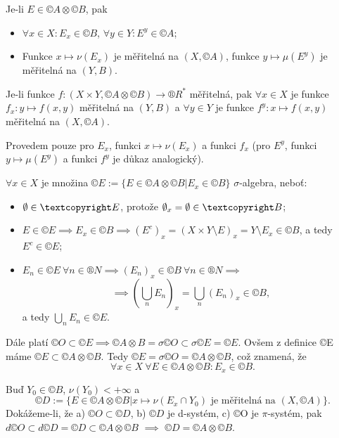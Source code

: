 \documentclass[12pt]{article}					%
\begin{document}
\begin{veta}
	Je-li $E \in ©A \otimes ©B$, pak

	\begin{itemize}
		\item $\forall x \in X: E_x \in ©B$, $\forall y \in Y: E^y \in ©A$;
		\item Funkce $x \mapsto \nu(E_x)$ je měřitelná na $(X, ©A)$, funkce $y \mapsto \mu(E^y)$ je měřitelná na $(Y, B)$.
	\end{itemize}

	Je-li funkce $f: (X \times Y, ©A \otimes ©B) \rightarrow ®R^*$ měřitelná, pak $\forall x \in X$ je funkce $f_x: y \mapsto f(x, y)$ měřitelná na $(Y, B)$ a $\forall y \in Y$ je funkce $f^y: x \mapsto f(x, y)$ měřitelná na $(X, ©A)$.

	\begin{dukazin}
		Provedem pouze pro $E_x$, funkci $x \mapsto \nu(E_x)$ a funkci $f_x$ (pro $E^y$, funkci $y \mapsto \mu(E^y)$ a funkci $f^y$ je důkaz analogický).
	\end{dukazin}

	\begin{dukazin}[Řez]
		$\forall x \in X$ je množina $©E := \{E \in ©A \otimes ©B | E_x \in ©B\}$ $\sigma$-algebra, neboť:
		
		\begin{itemize}
			\item $\O \in ©E$, protože $\O_x = \O \in ©B$;
			\item $E \in ©E \implies E_x \in ©B \implies (E^c)_x = (X \times Y \setminus E)_x = Y \setminus E_x \in ©B$, a tedy $E^c \in ©E$;
			\item $E_n \in ©E\ \forall n \in ®N \implies (E_n)_x \in ©B\ \forall n \in ®N \implies$
				$$ \implies (\bigcup_n E_n)_x = \bigcup_n(E_n)_x \in ©B, $$
				a tedy $\bigcup_n E_n \in ©E$.
		\end{itemize}

		Dále platí $©O \subset ©E \implies ©A \otimes B = \sigma ©O \subset \sigma ©E = ©E$. Ovšem z definice ©E máme $©E \subset ©A \otimes ©B$. Tedy $©E = \sigma ©O = ©A \otimes ©B$, což znamená, že
		$$ \forall x \in X\ \forall E \in ©A \otimes ©B: E_x \in ©B. $$
	\end{dukazin}

	\begin{dukazin}
		Buď $Y_0 \in ©B$, $\nu(Y_0) < +∞$ a
		$$ ©D := \{E \in ©A \otimes ©B | x \mapsto \nu(E_x \cap Y_0) \text{ je měřitelná na } (X, ©A)\}. $$
		Dokážeme-li, že a) $©O \subset ©D$, b) $©D$ je d-systém, c) ©O je $\pi$-systém, pak $d©O \subset d©D = ©D \subset ©A \otimes ©B$ $\implies$ $©D = ©A \otimes ©B$.


\end{dukazin}
\end{veta}
\end{document}
